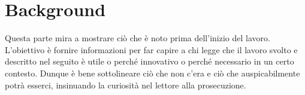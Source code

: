\section{Background}

	Questa parte mira a mostrare ciò che è noto prima dell'inizio del lavoro. L'obiettivo è fornire informazioni per far capire a chi legge 
	che il lavoro svolto e descritto nel seguito è utile o perché innovativo o perché necessario in un certo contesto. 
	Dunque è bene sottolineare ciò che non c'era e ciò che auspicabilmente potrà esserci, insinuando la curiosità nel lettore alla 
	prosecuzione.
